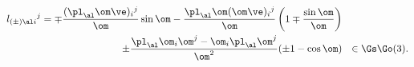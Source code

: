 \begin{equation}                                           \label{ealgrs}
\begin{split}
  l_{(\pm)\al i}{}^j=\mp\frac{(\pl_\al\om\ve)_i{}^j}\om\sin\om
  -\frac{\pl_\al\om(\om\ve)_i{}^j}\om\left(1\mp\frac{\sin\om}\om\right)&
\\
  \pm\frac{\pl_\al\om_i\om^j-\om_i\pl_\al\om^j}{\om^2}(\pm1-\cos\om)&
  ~~\in\Gs\Go(3).
\end{split}
\end{equation}

